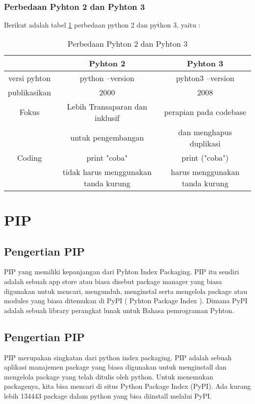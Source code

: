 \subsubsection{Perbedaan Pyhton 2 dan Pyhton 3}
Berikut adalah tabel \ref{table:perbedaan} perbedaan python 2 dan python 3, yaitu :
\begin{table}[h]
\caption{Perbedaan Pyhton 2 dan Pyhton 3}
\centering
\begin{tabular}{ccc}
\hline
 &Pyhton 2&Pyhton 3\\
\hline
versi pyhton&python --version&pyhton3 --version\\
publikasikan&2000&2008\\
Fokus&Lebih Transaparan dan inklusif &perapian pada codebase\\
&untuk pengembangan&dan menghapus duplikasi\\
Coding&print "coba"  &print ("coba")\\
&tidak harus menggunakan tanda kurung& harus menggunakan tanda kurung\\
\end{tabular}
\label{table:perbedaan}
\end{table}

\section{PIP}
\subsection{Pengertian PIP}
PIP yang memiliki kepanjangan dari Pyhton Index Packaging. PIP itu sendiri adalah sebuah app store atau biasa disebut package manager yang biasa digunakan untuk mencari, mengunduh, menginstal serta mengelola package atau modules yang biasa ditemukan di PyPI ( Pyhton Package Index ). Dimana PyPI adalah sebuah library perangkat lunak untuk Bahasa pemrograman Pyhton.
\subsection{Pengertian PIP}
PIP merupakan singkatan dari python index packaging. PIP adalah sebuah aplikasi manajemen package yang biasa digunakan untuk menginstall dan mengelola package yang telah ditulis oleh python. Untuk menemukan packagenya, kita bisa mencari di situs Python Package Index (PyPI). Ada kurang lebih 134443 package dalam python yang bisa diinstall melalui PyPI.
